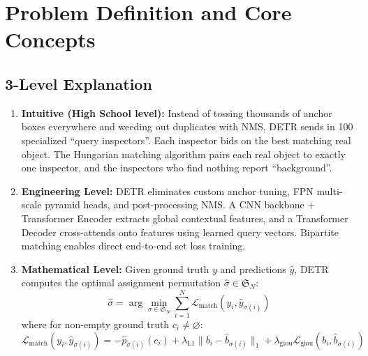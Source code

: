 \documentclass[11pt,a4paper]{article}
\theoremstyle{definition}
\begin{document}
\section{Problem Definition and Core Concepts}

\subsection{3-Level Explanation}
\begin{enumerate}
    \item \textbf{Intuitive (High School level):} Instead of tossing thousands of anchor boxes everywhere and weeding out duplicates with NMS, DETR sends in 100 specialized ``query inspectors''. Each inspector bids on the best matching real object. The Hungarian matching algorithm pairs each real object to exactly one inspector, and the inspectors who find nothing report ``background''.
    \item \textbf{Engineering Level:} DETR eliminates custom anchor tuning, FPN multi-scale pyramid heads, and post-processing NMS. A CNN backbone + Transformer Encoder extracts global contextual features, and a Transformer Decoder cross-attends onto features using learned query vectors. Bipartite matching enables direct end-to-end set loss training.
    \item \textbf{Mathematical Level:} Given ground truth $y$ and predictions $\hat{y}$, DETR computes the optimal assignment permutation $\hat{\sigma} \in \mathfrak{S}_N$:
    \begin{equation}
    \hat{\sigma} = \arg\min_{\sigma \in \mathfrak{S}_N} \sum_{i=1}^N \mathcal{L}_{\text{match}}(y_i, \hat{y}_{\sigma(i)})
    \end{equation}
    where for non-empty ground truth $c_i \ne \varnothing$:
    \begin{equation}
    \mathcal{L}_{\text{match}}(y_i, \hat{y}_{\sigma(i)}) = -\hat{p}_{\sigma(i)}(c_i) + \lambda_{\text{L1}} \|b_i - \hat{b}_{\sigma(i)}\|_1 + \lambda_{\text{giou}} \mathcal{L}_{\text{giou}}(b_i, \hat{b}_{\sigma(i)})
    \end{equation}
\end{enumerate}
\end{document}
